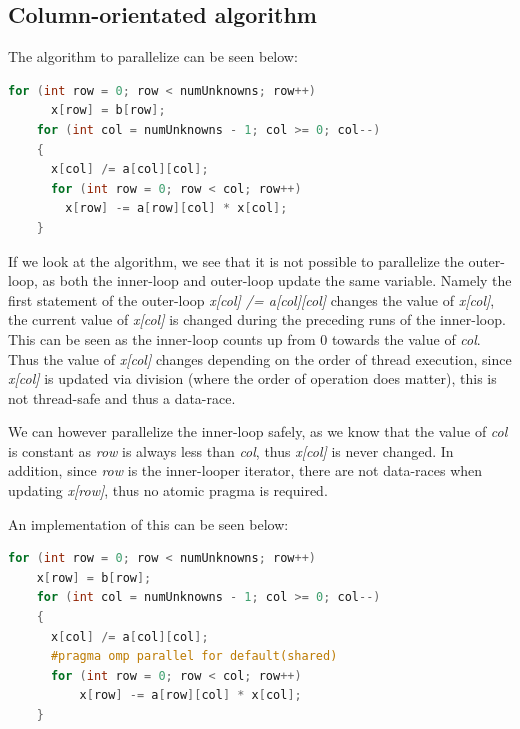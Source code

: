   \subsection{Column-orientated algorithm}
  The algorithm to parallelize can be seen below:
  \begin{lstlisting}[language=C++]
    for (int row = 0; row < numUnknowns; row++)
      x[row] = b[row];
    for (int col = numUnknowns - 1; col >= 0; col--)
    {
      x[col] /= a[col][col];
      for (int row = 0; row < col; row++)
        x[row] -= a[row][col] * x[col];
    }
  \end{lstlisting}

  If we look at the algorithm, we see that it is not possible to parallelize the outer-loop, as both the inner-loop and outer-loop update the same variable. 
  Namely the first statement of the outer-loop \textit{x[col] /= a[col][col]} changes the value of \textit{x[col]}, the current value of \textit{x[col]} is changed during the preceding runs
  of the inner-loop. This can be seen as the inner-loop counts up from 0 towards the value of \textit{col}. Thus the value of \textit{x[col]} changes depending on the order of thread execution,
  since \textit{x[col]} is updated via division (where the order of operation does matter), this is not thread-safe and thus a data-race. 


  We can however parallelize the inner-loop safely, as we know that the value of \textit{col} is constant as \textit{row} is always less than \textit{col}, thus \textit{x[col]} is never changed.
  In addition, since \textit{row} is the inner-looper iterator, there are not data-races when updating \textit{x[row]}, thus no atomic pragma is required.

  An implementation of this can be seen below:
  \begin{lstlisting}[language=C++]
    for (int row = 0; row < numUnknowns; row++)
    x[row] = b[row];
    for (int col = numUnknowns - 1; col >= 0; col--)
    {
      x[col] /= a[col][col];
      #pragma omp parallel for default(shared)  
      for (int row = 0; row < col; row++)
          x[row] -= a[row][col] * x[col];
    }
  \end{lstlisting}

